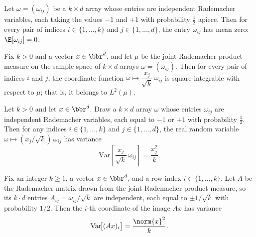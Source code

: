 \begin{lemma}
\label{integral_entry}
\leanok
{}
Let $\omega = (\omega_{ij})$ be a $k \times d$ array whose entries are independent
Rademacher variables, each taking the values $-1$ and $+1$ with probability $\tfrac12$
apiece. Then for every pair of indices $i \in \{1,\dots,k\}$ and $j \in \{1,\dots,d\}$,
the entry $\omega_{ij}$ has mean zero: $\E[\omega_{ij}] = 0$.
\end{lemma}

\begin{lemma}
\label{memLp_scaled_entry}
\leanok
{}
Fix $k > 0$ and a vector $x \in \bbr^d$, and let $\mu$ be the joint Rademacher product
measure on the sample space of $k \times d$ arrays $\omega = (\omega_{ij})$. Then for
every pair of indices $i$ and $j$, the coordinate function $\omega \mapsto
\dfrac{x_j}{\sqrt{k}}\,\omega_{ij}$ is square-integrable with respect to $\mu$; that is,
it belongs to $L^2(\mu)$.
\end{lemma}

\begin{lemma}
\label{variance_scaled_entry}
\leanok
{}
Let $k > 0$ and let $x \in \bbr^d$. Draw a $k \times d$ array $\omega$ whose entries
$\omega_{ij}$ are independent Rademacher variables, each equal to $-1$ or $+1$ with
probability $\tfrac{1}{2}$. Then for any indices $i \in \{1,\dots,k\}$ and $j \in
\{1,\dots,d\}$, the real random variable $\omega \mapsto (x_j/\sqrt{k})\,\omega_{ij}$
has variance
\[
\mathrm{Var}\!\left[\frac{x_j}{\sqrt{k}}\,\omega_{ij}\right] = \frac{x_j^2}{k}.
\]
\end{lemma}

\begin{lemma}
\label{variance_row_proj}
\leanok
{}
Fix an integer $k \ge 1$, a vector $x \in \bbr^d$, and a row index $i \in
\{1,\dots,k\}$. Let $A$ be the Rademacher matrix drawn from the joint Rademacher product
measure, so its $k \cdot d$ entries $A_{ij} = \omega_{ij}/\sqrt{k}$ are independent,
each equal to $\pm 1/\sqrt{k}$ with probability $1/2$. Then the $i$-th coordinate of the
image $Ax$ has variance
\[
  \mathrm{Var}\!\bigl[(Ax)_i\bigr] = \frac{\norm{x}^2}{k}.
\]
\end{lemma}


